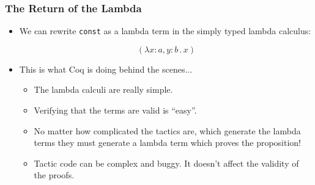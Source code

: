 \documentclass{beamer}
\begin{document}
\begin{frame}
  \frametitle{The Return of the Lambda}

  \begin{itemize}
  \item We can rewrite \texttt{const} as a lambda term in the simply typed lambda calculus:

    \[(\lambda x : a, y : b \, . \, x)\]

  \item<2-> This is what Coq is doing behind the scenes...

    \begin{itemize}
    \item The lambda calculi are really simple.
    \item Verifying that the terms are valid is ``easy''.
    \item No matter how complicated the tactics are, which generate the lambda terms they must generate a lambda term which proves the proposition!
    \item Tactic code can be complex and buggy. It doesn't affect the validity of the proofs.
    \end{itemize}
  \end{itemize}
\end{frame}
\end{document}
